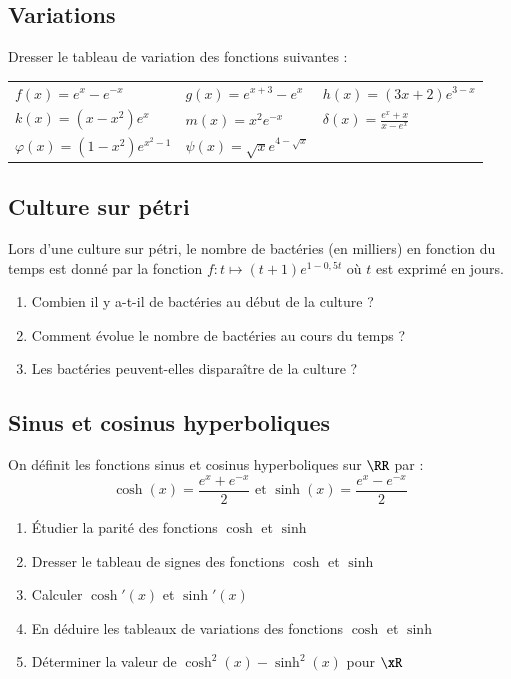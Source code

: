 \documentclass[oneside,12pt]{article}          %
\begin{document}
\subsection{Variations}
Dresser le tableau de variation des fonctions suivantes :

\renewcommand{\arraystretch}{1.3}
\begin{tabular}{p{} p{} p{}}
    $f(x)=e^{x}-e^{-x}$ & $g(x)=e^{x+3}-e^{x}$ & $h(x)=(3x+2)e^{3-x}$ \\
    $k(x)=(x-x^{2})e^{x}$ & $m(x)=x^{2}e^{-x}$ & $\delta(x)=\frac{e^{x}+x}{x-e^{x}}$ \\
    $\varphi(x)=(1-x^2)e^{x^2-1}$ & $\psi(x)=\sqrt{x}e^{4-\sqrt{x}}$ \\
\end{tabular}



\subsection{Culture sur pétri}
Lors d'une culture sur pétri, le nombre de bactéries (en milliers) en fonction du temps est donné par la fonction $f:t\mapsto(t+1)e^{1-0,5t}$ où $t$ est exprimé en jours.
\begin{enumerate}
    \item Combien il y a-t-il de bactéries au début de la culture ?
    \item Comment évolue le nombre de bactéries au cours du temps ?
    \item Les bactéries peuvent-elles disparaître de la culture ?
\end{enumerate}



\subsection{Sinus et cosinus hyperboliques}
On définit les fonctions sinus et cosinus hyperboliques sur $\RR$ par :
\[\cosh(x)=\frac{e^x+e^{-x}}{2} \text{  et  } \sinh(x)=\frac{e^x-e^{-x}}{2}\]
\begin{enumerate}
    \item Étudier la parité des fonctions $\cosh$ et $\sinh$
    \item Dresser le tableau de signes des fonctions $\cosh$ et $\sinh$
    \item Calculer $\cosh'(x)$ et $\sinh'(x)$
    \item En déduire les tableaux de variations des fonctions $\cosh$ et $\sinh$
    \item Déterminer la valeur de $\cosh^2(x)-\sinh^2(x)$ pour $\xR$
\end{enumerate}
\end{document}
